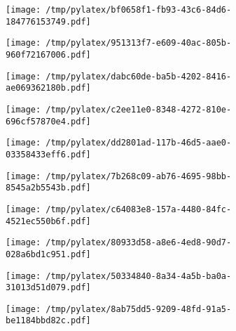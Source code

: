 \documentclass{article}
\begin{document}
\begin{figure}[htbp]
\begin{subfigure}[b]{.3\linewidth}
\texttt{[image: /tmp/pylatex/bf0658f1-fb93-43c6-84d6-184776153749.pdf]}
\end{subfigure}
\begin{subfigure}[b]{.3\linewidth}
\texttt{[image: /tmp/pylatex/951313f7-e609-40ac-805b-960f72167006.pdf]}
\end{subfigure}
\begin{subfigure}[b]{.3\linewidth}
\texttt{[image: /tmp/pylatex/dabc60de-ba5b-4202-8416-ae069362180b.pdf]}
\end{subfigure}
\begin{subfigure}[b]{.3\linewidth}
\texttt{[image: /tmp/pylatex/c2ee11e0-8348-4272-810e-696cf57870e4.pdf]}
\end{subfigure}
\begin{subfigure}[b]{.3\linewidth}
\texttt{[image: /tmp/pylatex/dd2801ad-117b-46d5-aae0-03358433eff6.pdf]}
\end{subfigure}
\begin{subfigure}[b]{.3\linewidth}
\texttt{[image: /tmp/pylatex/7b268c09-ab76-4695-98bb-8545a2b5543b.pdf]}
\end{subfigure}
\begin{subfigure}[b]{.3\linewidth}
\texttt{[image: /tmp/pylatex/c64083e8-157a-4480-84fc-4521ec550b6f.pdf]}
\end{subfigure}
\begin{subfigure}[b]{.3\linewidth}
\texttt{[image: /tmp/pylatex/80933d58-a8e6-4ed8-90d7-028a6bd1c951.pdf]}
\end{subfigure}
\begin{subfigure}[b]{.3\linewidth}
\texttt{[image: /tmp/pylatex/50334840-8a34-4a5b-ba0a-31013d51d079.pdf]}
\end{subfigure}
\begin{subfigure}[b]{.3\linewidth}
\texttt{[image: /tmp/pylatex/8ab75dd5-9209-48fd-91a5-be1184bbd82c.pdf]}
\end{subfigure}
\end{figure}
\end{document}
